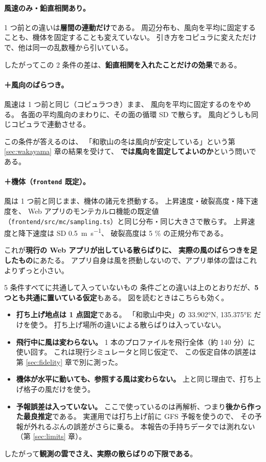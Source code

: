 \paragraph{風速のみ・鉛直相関あり。}
1 つ前との違いは\textbf{層間の連動だけ}である。
周辺分布も、風向を平均に固定することも、機体を固定することも変えていない。
引き方をコピュラに変えただけで、他は同一の乱数種から引いている。

したがってこの 2 条件の差は、\textbf{鉛直相関を入れたことだけの効果}である。

\paragraph{＋風向のばらつき。}
風速は 1 つ前と同じ（コピュラつき）まま、
風向を平均に固定するのをやめる。
各面の平均風向のまわりに、その面の循環 SD で散らす。
風向どうしも同じコピュラで連動させる。

この条件が答えるのは、
「和歌山の冬は風向が安定している」という第 \ref{sec:wakayama} 章の結果を受けて、
\textbf{では風向を固定してよいのか}という問いである。

\paragraph{＋機体（\texttt{frontend} 既定）。}
風は 1 つ前と同じまま、機体の諸元を摂動する。
上昇速度・破裂高度・降下速度を、
Web アプリのモンテカルロ機能の既定値
（\texttt{frontend/src/mc/sampling.ts}）と同じ分布・同じ大きさで散らす。
上昇速度と降下速度は SD \SI{0.5}{\metre\per\second}、
破裂高度は 5 \% の正規分布である。

これが\textbf{現行の Web アプリが出している散らばりに、
実際の風のばらつきを足したもの}にあたる。
アプリ自身は風を摂動しないので、アプリ単体の雲はこれよりずっと小さい。

\begin{whybox}{5 条件すべてに共通して入っていないもの}
条件ごとの違いは上のとおりだが、\textbf{5 つとも共通に置いている仮定}もある。
図を読むときはこちらも効く。

\begin{itemize}
  \item \textbf{打ち上げ地点は 1 点固定}である。
        「和歌山中央」の \ang{33.902}N, \ang{135.375}E だけを使う。
        打ち上げ場所の違いによる散らばりは入っていない。
  \item \textbf{飛行中に風は変わらない。}
        1 本のプロファイルを飛行全体（約 \num{140} 分）に使い回す。
        これは現行シミュレータと同じ仮定で、
        この仮定自体の誤差は第 \ref{sec:fidelity} 章で別に測った。
  \item \textbf{機体が水平に動いても、参照する風は変わらない。}
        上と同じ理由で、打ち上げ格子の風だけを使う。
  \item \textbf{予報誤差は入っていない。}
        ここで使っているのは再解析、つまり\textbf{後から作った最良推定}である。
        実運用では打ち上げ前に GFS 予報を使うので、
        その予報が外れるぶんの誤差がさらに乗る。
        本報告の手持ちデータでは測れない（第 \ref{sec:limits} 章）。
\end{itemize}

したがって\textbf{観測の雲でさえ、実際の散らばりの下限である}。
\end{whybox}

